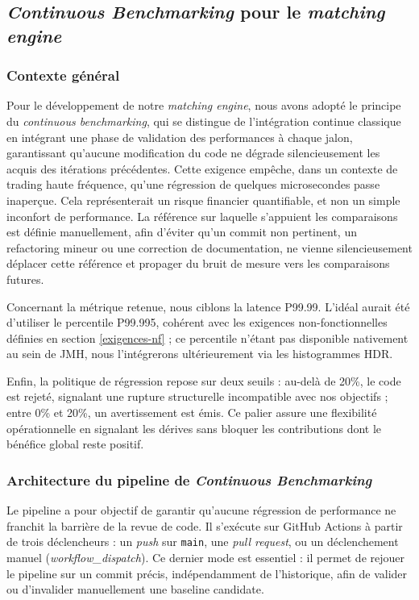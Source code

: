 \subsection{\textit{Continuous Benchmarking} pour le \textit{matching engine}}

\subsubsection{Contexte général}

Pour le développement de notre \textit{matching engine}, nous avons adopté le principe du \textit{continuous benchmarking}, qui se distingue de l'intégration continue classique en intégrant une phase de validation des performances à chaque jalon, garantissant qu'aucune modification du code ne dégrade silencieusement les acquis des itérations précédentes. Cette exigence empêche, dans un contexte de trading haute fréquence, qu'une régression de quelques microsecondes passe inaperçue. Cela représenterait un risque financier quantifiable, et non un simple inconfort de performance. La référence sur laquelle s'appuient les comparaisons est définie manuellement, afin d'éviter qu'un commit non pertinent, un refactoring mineur ou une correction de documentation, ne vienne silencieusement déplacer cette référence et propager du bruit de mesure vers les comparaisons futures.

Concernant la métrique retenue, nous ciblons la latence P99.99. L'idéal aurait été d'utiliser le percentile P99.995, cohérent avec les exigences non-fonctionnelles définies en section \ref{exigences-nf} ; ce percentile n'étant pas disponible nativement au sein de JMH, nous l'intégrerons ultérieurement via les histogrammes HDR.

Enfin, la politique de régression repose sur deux seuils : au-delà de 20\%, le code est rejeté, signalant une rupture structurelle incompatible avec nos objectifs ; entre 0\% et 20\%, un avertissement est émis. Ce palier assure une flexibilité opérationnelle en signalant les dérives sans bloquer les contributions dont le bénéfice global reste positif.

\subsubsection{Architecture du pipeline de \textit{Continuous Benchmarking}}

Le pipeline a pour objectif de garantir qu'aucune régression de performance ne franchit la barrière de la revue de code. Il s'exécute sur GitHub Actions à partir de trois déclencheurs : un \textit{push} sur \texttt{main}, une \textit{pull request}, ou un déclenchement manuel (\textit{workflow\_dispatch}). Ce dernier mode est essentiel : il permet de rejouer le pipeline sur un commit précis, indépendamment de l'historique, afin de valider ou d'invalider manuellement une baseline candidate.

